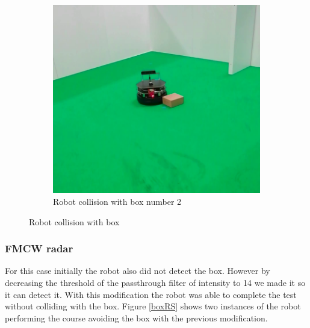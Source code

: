 \begin{figure}[h!]
\begin{subfigure}[b]{0.47\linewidth}
    \includegraphics[width=\linewidth]{imgs/chapter5/boxLF2.png}
    \caption{Robot collision with box number 2}
    \label{fig::box}
  \end{subfigure}
  \caption{Robot collision with box}
  \label{fig:boxLF}
\end{figure}


\subsubsection*{FMCW radar}
For this case initially the robot also did not detect the box. However by decreasing the threshold of the passthrough filter of intensity to 14 we made it so it can detect it. With this modification the robot was able to complete the test without colliding with the box. Figure \ref{boxRS} shows two instances of the robot performing the course avoiding the box with the previous modification.

